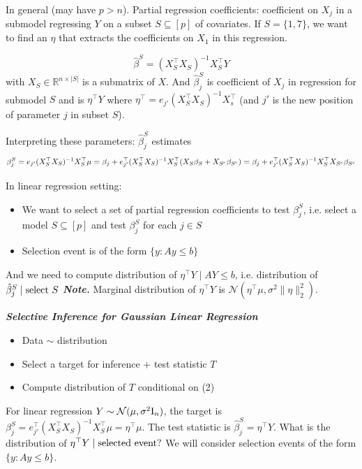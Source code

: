 \begin{example}
    In general (may have $p > n$). Partial regression coefficients: coefficient on $X_j$ in a submodel regressing $Y$ on a subset $S\subseteq [p]$ of covariates. If $S=\{1,7\}$, we want to find an $\eta$ that extracts the coefficients on $X_1$ in this regression.

    $$\hat{\beta}^S = (X_S^\top X_S)^{-1}X_S^\top Y$$ with $X_S \in \mathbb{R}^{n\times |S|}$ is a submatrix of $X$. And $\hat{\beta}_j^S$ is coefficient of $X_j$ in regression for submodel $S$ and is $\eta^\top Y$ where $\eta^\top = e_{j'}(X^\top_S X_S)^{-1} X^\top_s$ (and $j'$ is the new position of parameter $j$ in subset $S$).

    Interpreting these parameters: $\hat{\beta}_j^S$ estimates $$\beta^S_j = e_{j'}(X_S^\top X_S)^{-1}X_S^\top \mu = \beta_j + e_{j'}^\top (X_S^\top X_S)^{-1}X_S^\top (X_S\beta_S+X_{S^\textup{c}}\beta_{S^\textup{c}})=  \beta_j + e_{j'}^\top (X_S^\top X_S)^{-1} X_S^\top X_{S^c}\beta_{S^c}$$

    In linear regression setting:
    \begin{itemize}
        \item We want to select a set of partial regression coefficients to test $\beta_j^S$, i.e. select a model $S\subseteq [p]$ and test $\beta_j^S$ for each $j\in S$
        \item Selection event is of the form $\{y \colon Ay\leq b\}$
    \end{itemize}
    And we need to compute distribution of $\eta^\top  Y\mid AY\leq b$, i.e. distribution of $\hat{\beta}_j^S \mid \textup{select }S$
    \emph{\textbf{Note.}} Marginal distribution of $\eta^\top Y$ is $\mathcal{N}(\eta^\top \mu, \sigma^2\lVert\eta\rVert_2^2)$.
\end{example}



\emph{\textbf{Selective Inference for Gaussian Linear Regression}}
\begin{itemize} 
    \item[(1)] Data $\sim$ distribution 
    \item[(2)] Select a target for inference + test statistic $T$
    \item[(3)] Compute distribution of $T$ conditional on (2)
\end{itemize}

For linear regression $Y\sim \mathcal{N}(\mu,\sigma^2 \textup{I}_n)$, the target is $\beta_j^S = e^\top_{j'}(X_S^\top X_S)^{-1}X_S^\top \mu = \eta^\top\mu$. The test statistic is $\hat{\beta}_j^S = \eta^\top Y$. What is the distribution of $\eta^\top Y \mid \textup{selected event}?$ We will consider selection events of the form $\{y\colon Ay\leq b \}$.

